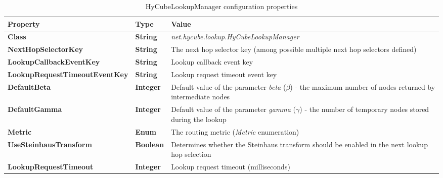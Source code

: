 \begin{table}
\scriptsize
\begin{center}
\begin{tabular}{p{4cm} p{2cm} p{8.5cm}}
	\hline
	\textbf{Property}						& \textbf{Type}					& \textbf{Value}					\\[1mm]
    \hline
	\textbf{Class}							& \textbf{String}				& \textit{net.hycube.lookup.HyCubeLookupManager}										\\[1.5mm]	
    \textbf{NextHopSelectorKey}				& \textbf{String}				& The next hop selector key (among possible multiple next hop selectors defined)		\\[1.5mm]	
	\textbf{LookupCallbackEventKey}			& \textbf{String}				& Lookup callback event key				\\[1.5mm]	
	\textbf{LookupRequestTimeoutEventKey}	& \textbf{String}				& Lookup request timeout event key		\\[1.5mm]	
	\textbf{DefaultBeta}					& \textbf{Integer}				& Default value of the parameter \emph{beta} ($\beta$) - the maximum number of nodes returned by intermediate nodes		\\[1.5mm]	
	\textbf{DefaultGamma}					& \textbf{Integer}				& Default value of the parameter \emph{gamma} ($\gamma$) - the number of temporary nodes stored during the lookup		\\[1.5mm]	
	\textbf{Metric}							& \textbf{Enum}					& The routing metric (\emph{Metric} enumeration)											\\[1.5mm]
	\textbf{UseSteinhausTransform}			& \textbf{Boolean}				& Determines whether the Steinhaus transform should be enabled in the next lookup hop selection				\\[1.5mm]	
	\textbf{LookupRequestTimeout}			& \textbf{Integer}				& Lookup request timeout (milliseconds) 			\\[1.5mm]	
    \hline
\end{tabular}
\end{center}
\caption{HyCubeLookupManager configuration properties}
\label{tab:libHyCubeLookupManager}
\end{table}

